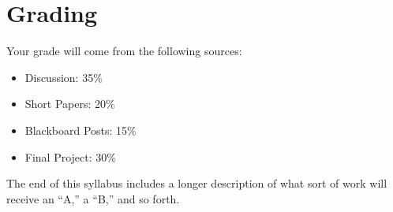 \section{Grading}

Your grade will come from the following sources:

\begin{itemize}
\itemsep1pt\parskip0pt
\item
  Discussion: 35\%
\item
  Short Papers: 20\%
\item
  Blackboard Posts: 15\%
\item
  Final Project: 30\%
\end{itemize}

The end of this syllabus includes a longer description of what sort of
work will receive an ``A,'' a ``B,'' and so forth.
